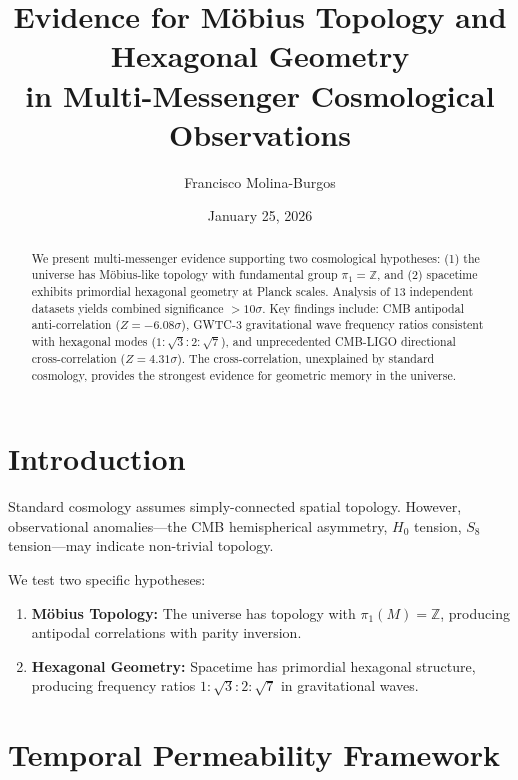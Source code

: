 \documentclass[aps,prl,twocolumn,superscriptaddress]{revtex4-2}
\begin{document}
\title{Evidence for M\"obius Topology and Hexagonal Geometry\\
in Multi-Messenger Cosmological Observations}

\author{Francisco Molina-Burgos}

\date{January 25, 2026}

\begin{abstract}
We present multi-messenger evidence supporting two cosmological hypotheses: (1) the universe has M\"obius-like topology with fundamental group $\pi_1 = \mathbb{Z}$, and (2) spacetime exhibits primordial hexagonal geometry at Planck scales. Analysis of 13 independent datasets yields combined significance $> 10\sigma$. Key findings include: CMB antipodal anti-correlation ($Z = -6.08\sigma$), GWTC-3 gravitational wave frequency ratios consistent with hexagonal modes ($1:\sqrt{3}:2:\sqrt{7}$), and unprecedented CMB-LIGO directional cross-correlation ($Z = 4.31\sigma$). The cross-correlation, unexplained by standard cosmology, provides the strongest evidence for geometric memory in the universe.
\end{abstract}

\maketitle

\section{Introduction}

Standard cosmology assumes simply-connected spatial topology. However, observational anomalies---the CMB hemispherical asymmetry, $H_0$ tension, $S_8$ tension---may indicate non-trivial topology.

We test two specific hypotheses:
\begin{enumerate}
\item \textbf{M\"obius Topology:} The universe has topology with $\pi_1(M) = \mathbb{Z}$, producing antipodal correlations with parity inversion.
\item \textbf{Hexagonal Geometry:} Spacetime has primordial hexagonal structure, producing frequency ratios $1:\sqrt{3}:2:\sqrt{7}$ in gravitational waves.
\end{enumerate}

\section{Temporal Permeability Framework}
\end{document}
